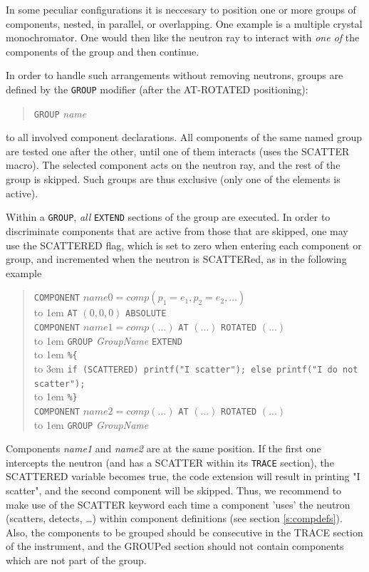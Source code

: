 In some peculiar configurations it is neccesary to position one or
more groups of components, nested, in parallel, or overlapping. One
example is a multiple crystal monochromator. One would then like the
neutron ray to interact with \emph{one of} the components of the group
and then continue.

In order to handle such arrangements without removing neutrons, groups are defined by the \texttt{GROUP} modifier (after the AT-ROTATED positioning):
\begin{quote}
  \texttt{GROUP} \textit{name}
\end{quote}
to all involved component declarations. 
All components of the same named group are tested one after the other,
until one of them interacts (uses the SCATTER
macro). The selected component acts on
the neutron ray, and the rest of the group is skipped. Such groups are thus exclusive (only one of the elements is active).

Within a \texttt{GROUP}, \emph{all} \texttt{EXTEND} sections of the group are executed. In order to discriminate components that are active from those that are skipped, one may use the SCATTERED flag, which is set to zero when entering each component or group, and incremented when the neutron is SCATTERed, as in the following example  
\begin{quote}
  \texttt{COMPONENT} $\textit{name0} =
    \textit{comp}(p_1 = e_1, p_2 = e_2, \ldots)$ \\
    \hbox to 1em{} \texttt{AT} $(0,0,0)$ \texttt{ABSOLUTE} \\
  \texttt{COMPONENT} $\textit{name1} =
    \textit{comp}(\ldots)$ \texttt{AT} $(...)$  \texttt{ROTATED} $(...)$ \\
  \hbox to 1em{} \texttt{GROUP} \textit{GroupName} \texttt{EXTEND} \\
  \hbox to 1em{} \verb|%{| \\
  \hbox to 3em{} \verb+if (SCATTERED) printf("I scatter"); else printf("I do not scatter");+\\
  \hbox to 1em{} \verb|%}| \\
  \texttt{COMPONENT} $\textit{name2} =
    \textit{comp}(\ldots)$ \texttt{AT} $(...)$ \texttt{ROTATED} $(...)$ \\
  \hbox to 1em{} \texttt{GROUP} \textit{GroupName}
\end{quote}
Components \emph{name1} and \emph{name2} are at the same position. If the first one intercepts the neutron (and has a SCATTER within its \texttt{TRACE} section), the SCATTERED variable becomes true, the code extension will result in printing "I scatter", and the second component will be skipped.
Thus, we recommend to make use of the SCATTER keyword each time a component 'uses' the neutron (scatters, detects, \ldots) within component definitions (see section \ref{s:compdefs}). Also, the components to be grouped should be consecutive in the TRACE section of the instrument, and the GROUPed section should not contain components which are not part of the group.

